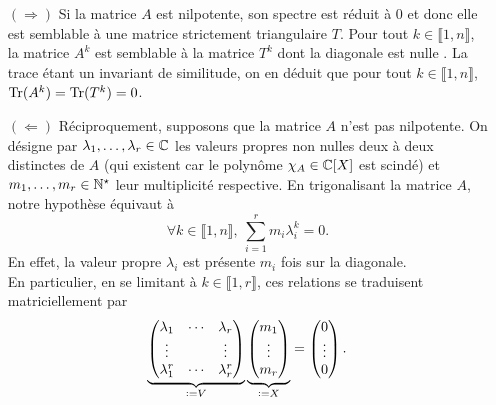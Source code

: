 \begin{preuve}
    \begin{itemize}
        \item[$(\Rightarrow)$] Si la matrice $A$ est nilpotente, son spectre est réduit à $0$ et donc elle est semblable à une matrice strictement triangulaire $T$. Pour tout $k \in \llbracket 1, n \rrbracket$, la matrice $A^k$ est semblable à la matrice $T^k$ dont la diagonale est nulle \note. La trace étant un invariant de similitude, on en déduit que pour tout $k \in \llbracket 1, n \rrbracket$, $\mathrm{Tr}(A^k) = \mathrm{Tr}(T^k) = 0$.
        \item[$(\Leftarrow)$] Réciproquement, supposons que la matrice $A$ n'est pas nilpotente. On désigne par $\lambda_1, \dots, \lambda_r \in \mathbb{C}$ les valeurs propres non nulles deux à deux distinctes de $A$ (qui existent car le polynôme $\chi_A \in \mathbb{C}[X]$ est scindé) et $m_1, \dots, m_r \in \mathbb{N}^\star$ leur multiplicité respective. En trigonalisant la matrice $A$, notre hypothèse équivaut à
        $$\forall k \in \llbracket 1, n \rrbracket,\ \sum_{i=1}^r m_i \lambda_i^k = 0.$$
        En effet, la valeur propre $\lambda_i$ est présente $m_i$ fois sur la diagonale. \\
        En particulier, en se limitant à $k \in \llbracket 1, r \rrbracket$, ces relations se traduisent matriciellement par
        $$
        \underbrace{
        \begin{pmatrix}
        \lambda_1 & \cdots & \lambda_r \\
        \vdots & & \vdots \\
        \lambda_1^r & \cdots & \lambda_r^r
        \end{pmatrix}
        }_{\defeq V}
        \underbrace{
        \begin{pmatrix}
            m_1 \\ \vdots \\ m_r
        \end{pmatrix}
        }_{\defeq X}
        = 
        \begin{pmatrix}
        0 \\ \vdots \\ 0
        \end{pmatrix}.
        $$
        

\end{itemize}
\end{preuve}

